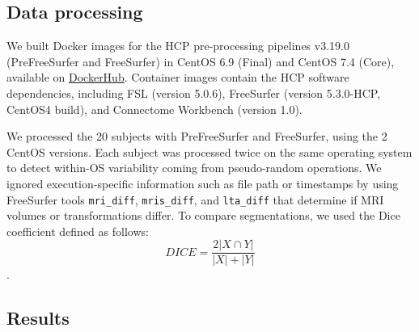 \documentclass[a4paper,num-refs]{oup-contemporary}
\begin{document}
\subsection{Data processing}

We built Docker images for the HCP pre-processing pipelines v3.19.0
(PreFreeSurfer and FreeSurfer) in CentOS 6.9 (Final) and CentOS 7.4 (Core), available on
\href{https://hub.docker.com/r/bigdatalabteam/hcp-prefreesurfer/}{DockerHub}.
Container images contain the HCP software dependencies, including FSL
(version 5.0.6), FreeSurfer (version 5.3.0-HCP, CentOS4 build), and
Connectome Workbench (version 1.0).

We processed the 20 subjects with PreFreeSurfer and FreeSurfer, using the 2
CentOS versions. Each subject was processed twice on the same operating
system to detect within-OS variability coming from pseudo-random
operations. We ignored execution-specific information such as file path or
timestamps by using FreeSurfer tools \texttt{mri\_diff},
\texttt{mris\_diff}, and \texttt{lta\_diff} that determine if MRI volumes
or transformations differ. To compare segmentations, we used the Dice coefficient defined as follows:
\[DICE=\frac{2|X \cap Y|}{|X| + |Y|}\].



\subsection{Results}


\end{document}
